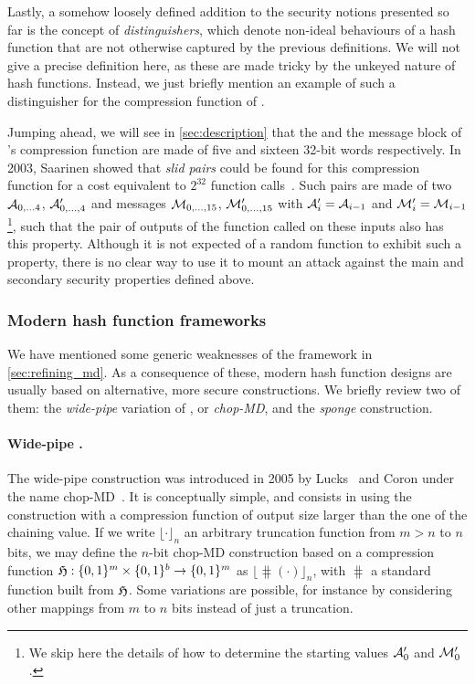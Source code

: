Lastly, a somehow loosely defined addition to the security notions presented so far is the concept of \emph{distinguishers}, which denote non-ideal behaviours
of a hash function that are not otherwise captured by the previous definitions. We will not give a precise definition here, as these are made tricky by
the unkeyed nature of hash functions. Instead, we just briefly mention an example of such a distinguisher for the compression function of \shaone.

Jumping ahead, we will see in \autoref{sec:description} that the \iv and the message block of \shaone's compression function are made of five and sixteen
32-bit words respectively. In 2003, Saarinen showed that \emph{slid pairs} could be found for this compression function for a cost equivalent to $2^{32}$
function calls~\cite{DBLP:conf/fse/Saarinen03}. Such pairs are made of two \ivs $\mathcal{A}_{0,\ldots4}$, $\mathcal{A}'_{0,\ldots,4}$ and messages $\mathcal{M}_{0,\ldots,15}$,
$\mathcal{M}'_{0,\ldots,15}$ with $\mathcal{A}'_i = \mathcal{A}_{i-1}$ and $\mathcal{M}'_i = \mathcal{M}_{i-1}$\footnote{We skip here the details of how to determine the starting values $\mathcal{A}'_0$ and $\mathcal{M}'_0$.}, such that the
pair of outputs of the function called on these inputs also has this property. Although it is not expected of a random function to exhibit such a property, there is no clear way to use it to mount
an attack against the main and secondary security properties defined above.


\subsubsection{Modern hash function frameworks}
\label{sec:betterhash}

We have mentioned some generic weaknesses of the \merkdam framework in \autoref{sec:refining_md}. As a consequence of these, modern hash function designs are usually based on alternative,
more secure constructions. We briefly review two of them: the \emph{wide-pipe} variation of \merkdam, or \emph{chop-MD}, and the \emph{sponge} construction.

\paragraph{Wide-pipe \merkdam.} The wide-pipe construction was introduced in 2005 by Lucks~\cite{DBLP:conf/asiacrypt/Lucks05} and Coron \etal under the name chop-MD~\cite{DBLP:conf/crypto/CoronDMP05}.
It is conceptually simple, and consists in using the \merkdam construction with a compression function of output size larger than the one of the chaining value. If we write $\lfloor\cdot\rfloor_n$
an arbitrary truncation function from $m > n$ to $n$ bits, we may define the $n$-bit chop-MD construction based on a compression function $\operatorname{\mathfrak{H}} : \{0,1\}^m \times \{0,1\}^b \rightarrow \{0,1\}^m$
as $\lfloor\hash(\cdot)\rfloor_n$, with $\hash$ a standard \merkdam function built from $\operatorname{\mathfrak{H}}$. Some variations are possible, for instance by considering other mappings from $m$ to $n$
bits instead of just a truncation.

